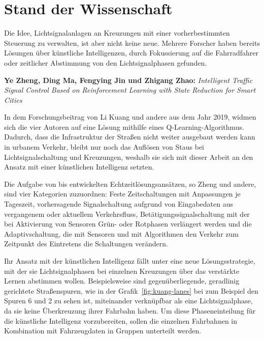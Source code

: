 %
%


\section{Stand der Wissenschaft}\label{sec:state-of-science}

Die Idee, Lichtsignalanlagen an Kreuzungen mit einer vorherbestimmten Steuerung zu verwalten, ist aber nicht keine neue.
Mehrere Forscher haben bereits Lösungen über künstliche Intelligenzen, durch Fokussierung auf die Fahrradfahrer oder zeitlicher Abstimmung von den Lichtsignalphasen gefunden.

\textbf{Ye Zheng, Ding Ma, Fengying Jin und Zhigang Zhao:}
\textit{Intelligent Traffic Signal Control Based on Reinforcement Learning with State Reduction for Smart Cities}

In dem Forschungsbeitrag von Li Kuang und andere aus dem Jahr 2019, widmen sich die vier Autoren auf eine Lösung mithilfe eines Q-Learning-Algorithmus.
Dadurch, dass die Infrastruktur der Straßen nicht weiter ausgebaut werden kann in urbanem Verkehr, bleibt nur noch das Auflösen von Staus bei Lichtsignalschaltung und Kreuzungen\cite[S. 2]{Zheng2019}, weshalb sie sich mit dieser Arbeit an den Ansatz mit einer künstlichen Intelligenz setzten.

Die Aufgabe von bis entwickelten Echtzeitlösungsansätzen, so Zheng und andere, sind vier Kategorien zuzuordnen:
Feste Zeitschaltungen mit Anpassungen je Tageszeit, vorhersagende Signalschaltung aufgrund von Eingabedaten aus vergangenem oder aktuellem Verkehrsfluss, Betätigungssignalschaltung mit der bei Aktivierung von Sensoren Grün- oder Rotphasen verlängert werden und die Adaptivschaltung, die mit Sensoren und mit Algorithmen den Verkehr zum Zeitpunkt des Eintretens die Schaltungen verändern\cite[S. 2]{Zheng2019}.

Ihr Ansatz mit der künstlichen Intelligenz fällt unter eine neue Lösungsstrategie, mit der sie Lichtsignalphasen bei einzelnen Kreuzungen über das verstärkte Lernen abstimmen wollen\cite[S. 3]{Zheng2019}.
Beispielsweise sind gegenüberliegende, geradlinig gerichtete Straßenspuren, wie in der Grafik~\ref{fig:kuang-lanes} bei zum Beispiel den Spuren 6 und 2 zu sehen ist, miteinander verknüpfbar als eine Lichtsignalphase, da sie keine Überkreuzung ihrer Fahrbahn haben.
Um diese Phaseneinteilung für die künstliche Intelligenz vorzubereiten, sollen die einzelnen Fahrbahnen in Kombination mit Fahrzeugdaten in Gruppen unterteilt werden\cite[S. 6]{Zheng2019}.

